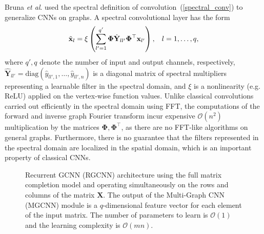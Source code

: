 \documentclass{article}
\newcommand{\etal}{\textit{et al}. }
\begin{document}
Bruna \etal \citeyear{bruna2013spectral} used the spectral definition of convolution~(\ref{spectral_conv}) to generalize CNNs on graphs. 
A spectral convolutional layer has the form 
\begin{equation} 
\label{spectral_construction_eq}
\tilde{\mathbf{x}}_l =   \xi \left(  \sum_{l'=1}^{q'} \boldsymbol{\Phi} \hat{\mathbf{Y}}_{ll'} \boldsymbol{\Phi}^\top \mathbf{x}_{l'} \right), \hspace{3mm} l = 1,\hdots, q,
\end{equation}
where $q', q$ denote the number of input and output channels, respectively,  
$\hat{\mathbf{Y}}_{ll'} = \mathrm{diag}(\hat{y}_{ll',1}, \hdots, \hat{y}_{ll',n})$ is a diagonal matrix of spectral multipliers representing a learnable filter in the spectral domain, and $\xi$ is a nonlinearity (e.g. ReLU) applied on the vertex-wise function values. 
Unlike classical convolutions carried out efficiently in the spectral domain using FFT, the computations of the forward and inverse graph Fourier transform incur expensive $\mathcal{O}(n^2)$ multiplication by the matrices $\boldsymbol{\Phi}, \boldsymbol{\Phi}^\top$, as there are no FFT-like algorithms on general graphs. 
Furthermore, there is no guarantee that the filters represented in the spectral domain are localized in the spatial domain, which is an important property of classical CNNs.  




\begin{figure*}[ht!]
\centering
\vspace{1mm}
\caption{Recurrent GCNN (RGCNN) architecture using the full matrix completion model and operating simultaneously on the rows and columns of the matrix $\mathbf{X}$. The output of the Multi-Graph CNN (MGCNN) module is a $q$-dimensional feature vector for each element of the input matrix. The number of parameters to learn is $\mathcal{O}(1)$ and the learning complexity is $\mathcal{O}(mn)$.
 }
\label{fig:architectureX}
\end{figure*}	
\end{document}
